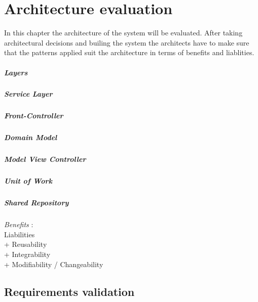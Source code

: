 
\newcommand{\bo}[1]{\textbf{#1}}

\chapter{Architecture evaluation}
\label{ch:evaluation}
In this chapter the architecture of the system will be evaluated. After taking architectural decisions and builing the system the architects have to make sure that the patterns applied suit the architecture in terms of benefits and liablities.

\paragraph{Layers}
\paragraph{Service Layer}
\paragraph{Front-Controller}
\paragraph{Domain Model}
\paragraph{Model View Controller}
\paragraph{Unit of Work}
\paragraph{Shared Repository}
\textit{Benefits} : \\
\textit{} Liabilities \\
+ Reusability \\
+ Integrability \\
+ Modifiability / Changeability \\

\section{Requirements validation}
\label{sec:req-validation}

